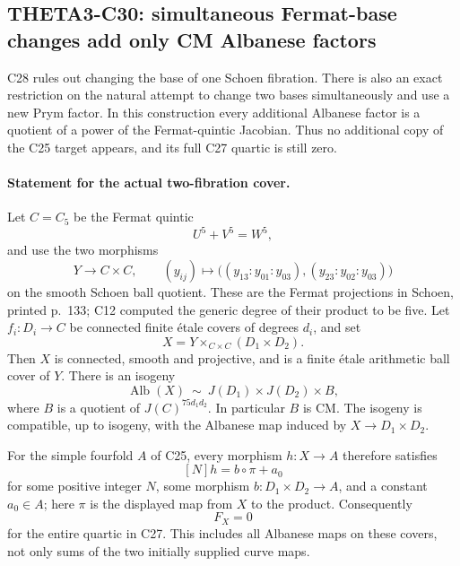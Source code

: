 \subsection{THETA3-C30: simultaneous Fermat-base changes add only CM Albanese factors}\label{C30}

C28 rules out changing the base of one Schoen fibration.
There is also an exact restriction on the natural attempt
to change two bases simultaneously and use a new Prym
factor.  In this construction every additional Albanese
factor is a quotient of a power of the Fermat-quintic
Jacobian.  Thus no additional copy of the C25 target
appears, and its full C27 quartic is still zero.

\paragraph{Statement for the actual two-fibration cover.}
Let $C=C_5$ be the Fermat quintic
\[
                 U^5+V^5=W^5,
\]
and use the two morphisms
\[
 Y\longrightarrow C\times C,\qquad
 (y_{ij})\longmapsto
 \bigl((y_{13}:y_{01}:y_{03}),
       (y_{23}:y_{02}:y_{03})\bigr)
                                                        \tag{C30a}
\]
on the smooth Schoen ball quotient.  These are the
Fermat projections in Schoen, printed p.~133; C12
computed the generic degree of their product to be five.
Let $f_i:D_i\to C$ be connected finite \'etale covers
of degrees $d_i$, and set
\[
               X=Y\times_{C\times C}(D_1\times D_2).
                                                        \tag{C30b}
\]
Then $X$ is connected, smooth and projective, and is a
finite \'etale arithmetic ball cover of $Y$.  There is
an isogeny
\[
 \operatorname{Alb}(X)\ \sim\ J(D_1)\times J(D_2)\times B,
                                                        \tag{C30c}
\]
where $B$ is a quotient of
$J(C)^{75d_1d_2}$.  In particular $B$ is CM.
The isogeny is compatible, up to isogeny, with the
Albanese map induced by $X\to D_1\times D_2$.

For the simple fourfold $A$ of C25, every morphism
$h:X\to A$ therefore satisfies
\[
 [N]h=b\circ\pi+a_0
                                                        \tag{C30d}
\]
for some positive integer $N$, some morphism
$b:D_1\times D_2\to A$, and a constant $a_0\in A$;
here $\pi$ is the displayed map from $X$ to the product.
Consequently
\[
                    F_X=0
                                                        \tag{C30e}
\]
for the entire quartic in C27.  This includes all
Albanese maps on these covers, not only sums of the two
initially supplied curve maps.

